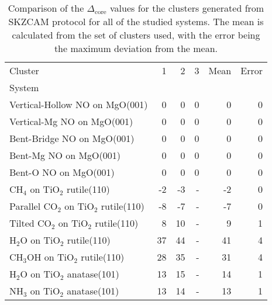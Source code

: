 \begin{table}
\caption{\label{tab:deltacore}Comparison of the $\Delta_\text{core}$ values for the clusters generated from SKZCAM protocol for all of the studied systems. The mean is calculated from the set of clusters used, with the error being the maximum deviation from the mean.}
\begin{adjustbox}{center,max width=1\textwidth}
\begin{tabular}{lrrrrr}
\toprule
Cluster & 1 & 2 & 3 & Mean & Error \\ 
System &  &  &  &  &  \\
\midrule
Vertical-Hollow NO on MgO(001) & 0 & 0 & 0 & 0 & 0 \\
Vertical-Mg NO on MgO(001) & 0 & 0 & 0 & 0 & 0 \\
Bent-Bridge NO on MgO(001) & 0 & 0 & 0 & 0 & 0 \\
Bent-Mg NO on MgO(001) & 0 & 0 & 0 & 0 & 0 \\
Bent-O NO on MgO(001) & 0 & 0 & 0 & 0 & 0 \\
CH$_4$ on TiO$_2$ rutile(110) & -2 & -3 & - & -2 & 0 \\
Parallel CO$_2$ on TiO$_2$ rutile(110) & -8 & -7 & - & -7 & 0 \\
Tilted CO$_2$ on TiO$_2$ rutile(110) & 8 & 10 & - & 9 & 1 \\
H$_2$O on TiO$_2$ rutile(110) & 37 & 44 & - & 41 & 4 \\
CH$_3$OH on TiO$_2$ rutile(110) & 28 & 35 & - & 31 & 4 \\
H$_2$O on TiO$_2$ anatase(101) & 13 & 15 & - & 14 & 1 \\
NH$_3$ on TiO$_2$ anatase(101) & 13 & 14 & - & 13 & 1 \\
\bottomrule
\end{tabular}
\end{adjustbox}
\end{table}